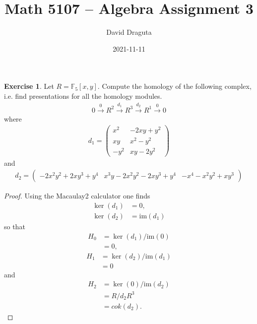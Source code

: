 \documentclass[12pt]{extarticle}
\title{ Math 5107 -- Algebra Assignment 3}
\author{David Draguta}
\date{2021-11-11}
\newcommand{\im}{\text{im}}
\newcommand{\<}{\langle}
\renewcommand{\>}{\rangle}
\theoremstyle{definition}
\newtheorem{exercise}{Exercise}
\begin{document}
\maketitle

\begin{exercise}
  Let $R = \mathbb{F}_5[x,y]$. Compute the homology of the following complex, i.e. find presentations for all the homology modules.
  \begin{align*}
    0 \xrightarrow{0} R^2 \xrightarrow{d_1} R^3 \xrightarrow{d_2} R^1 \xrightarrow{0} 0 
  \end{align*}
  where
  \begin{align*}
    d_1 = 
    \begin{pmatrix}
      x^2  & -2xy+y^2 \\
      xy   & x^2 - y^2 \\
      -y^2 & xy - 2y^2 
    \end{pmatrix}
  \end{align*}
  and
    \begin{align*}
    d_2 = 
    \begin{pmatrix}
      -2x^2y^2+2xy^3+y^4 & x^3y-2x^2y^2-2xy^3+y^4 & -x^4-x^2y^2+xy^3
    \end{pmatrix}
  \end{align*}
\end{exercise}
\begin{proof}
  Using the Macaulay2 calculator one finds
  \begin{align*}
    \ker(d_1) &= 0, \\
    \ker(d_2) &= \im(d_1)
  \end{align*}
  so that
  \begin{align*}
    H_0 &= \ker(d_1)/\im(0) \\
    &= 0,
  \end{align*}
  \begin{align*}
    H_1 &= \ker(d_2)/\im(d_1)  \\
    &= 0
  \end{align*}
  and
  \begin{align*}
    H_2
    &= \ker(0)/\im(d_2) \\
    &= R/d_2R^3 \\
    &= cok(d_2).
  \end{align*}
  
\end{proof}
\end{document}
